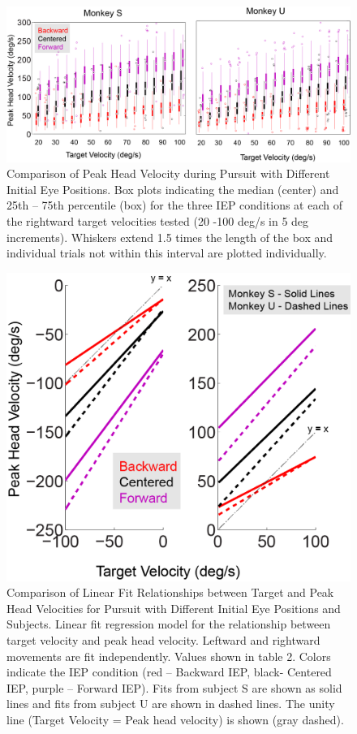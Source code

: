 \documentclass[12pt]{article}
\begin{document}
\begin{figure}[h]
\centering
\includegraphics[width=0.9\linewidth]{./figs/RampBoxplot}
\caption[Peak Head Velocity during Pursuit of Ramp Targets]{Comparison of Peak Head Velocity during Pursuit with Different Initial Eye Positions. Box plots indicating the median (center) and 25th – 75th percentile (box) for the three IEP conditions at each of the rightward target velocities tested (20 -100 deg/s in 5 deg increments). Whiskers extend 1.5 times the length of the box and individual trials not within this interval are plotted individually.}
\label{fig:RampBoxplot}
\end{figure}

\begin{figure}
\centering
\includegraphics[width=0.7\linewidth]{./figs/RampRegressions}
\caption{Comparison of Linear Fit Relationships between Target and Peak Head Velocities for Pursuit with Different Initial Eye Positions and Subjects. Linear fit regression model for the relationship between target velocity and peak head velocity. Leftward and rightward movements are fit independently. Values shown in table 2. Colors indicate the IEP condition (red – Backward IEP, black- Centered IEP, purple – Forward IEP). Fits from subject S are shown as solid lines and fits from subject U are shown in dashed lines. The unity line (Target Velocity = Peak head velocity) is shown (gray dashed).}
\label{fig:RampRegressions}
\end{figure}
\end{document}

